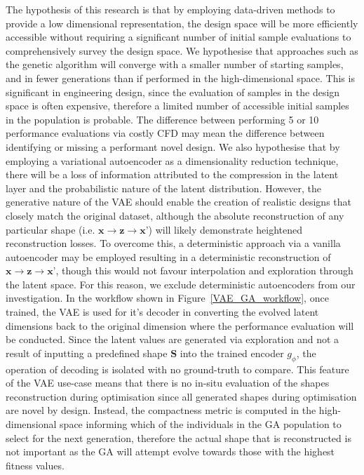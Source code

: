 \documentclass{article}
\begin{document}
The hypothesis of this research is that by employing data-driven methods to provide a low dimensional representation, the design space will be more efficiently accessible without requiring a significant number of initial sample evaluations to comprehensively survey the design space. We hypothesise that approaches such as the genetic algorithm will converge with a smaller number of starting samples, and in fewer generations than if performed in the high-dimensional space. This is significant in engineering design, since the evaluation of samples in the design space is often expensive, therefore a limited number of accessible initial samples in the population is probable. The difference between performing 5 or 10 performance evaluations via costly CFD may mean the difference between identifying or missing a performant novel design. We also hypothesise that by employing a variational autoencoder as a dimensionality reduction technique, there will be a loss of information attributed to the compression in the latent layer and the probabilistic nature of the latent distribution. However, the generative nature of the VAE should enable the creation of realistic designs that closely match the original dataset, although the absolute reconstruction of any particular shape (i.e. $\textbf{x} \rightarrow \textbf{z} \rightarrow \textbf{x'}$) will likely demonstrate heightened reconstruction losses. To overcome this, a deterministic approach via a vanilla autoencoder may be employed resulting in a deterministic reconstruction of $\textbf{x}\rightarrow\textbf{z}\rightarrow\textbf{x'}$, though this would not favour interpolation and exploration through the latent space. For this reason, we exclude deterministic autoencoders from our investigation.  In the workflow shown in Figure~\ref{VAE_GA_workflow}, once trained, the VAE is used for it's decoder in converting the evolved latent dimensions back to the original dimension where the performance evaluation will be conducted. Since the latent values are generated via exploration and not a result of inputting a predefined shape $\textbf{S}$ into the trained encoder $g_\phi$, the operation of decoding is isolated with no ground-truth to compare. This feature of the VAE use-case means that there is no in-situ evaluation of the shapes reconstruction during optimisation  since all generated shapes during optimisation are novel by design. Instead, the compactness metric is computed in the high-dimensional space informing which of the individuals in the GA population to select for the next generation, therefore the actual shape that is reconstructed is not important as the GA will attempt evolve towards those with the highest fitness values.
\end{document}
